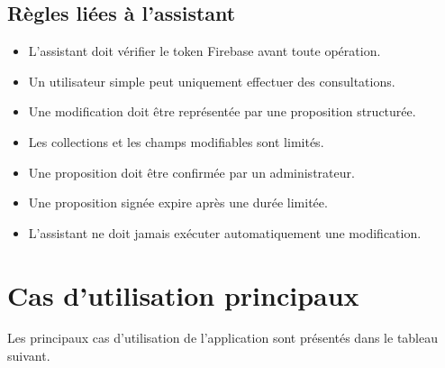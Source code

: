 \documentclass{rapportENSIAS}
\begin{document}
\subsection{Règles liées à l’assistant}

\begin{itemize}
\item L’assistant doit vérifier le token Firebase avant toute opération.
\item Un utilisateur simple peut uniquement effectuer des consultations.
\item Une modification doit être représentée par une proposition structurée.
\item Les collections et les champs modifiables sont limités.
\item Une proposition doit être confirmée par un administrateur.
\item Une proposition signée expire après une durée limitée.
\item L’assistant ne doit jamais exécuter automatiquement une modification.
\end{itemize}

\section{Cas d’utilisation principaux}

Les principaux cas d’utilisation de l’application sont présentés dans le tableau suivant.
\end{document}
